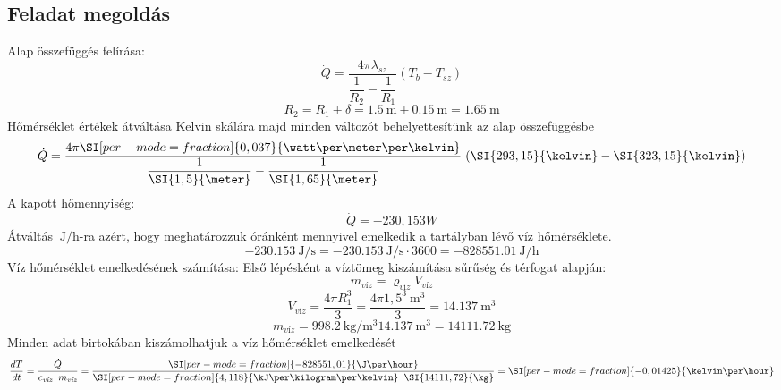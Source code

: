 \subsection*{Feladat megoldás}
Alap összefüggés felírása:
\begin{equation}
\dot{Q} =\dfrac{4 \pi  \lambda_{sz}}{\dfrac{1}{R_2} - \dfrac{1}{R_1}} (T_b-T_{sz}) 
\end{equation}
\begin{equation*}
R_2=R_1+\delta=\SI{1,5}{\meter}+\SI{0,15}{\meter}=\SI{1,65}{\meter}
\end{equation*}
Hőmérséklet értékek átváltása Kelvin skálára majd minden változót  behelyettesítünk az alap összefüggésbe 
\begin{equation}
\dot{Q}=\dfrac{4\pi\SI[per-mode=fraction]{0,037}{\watt\per\meter\per\kelvin}}
{\dfrac{1}{\SI{1,5}{\meter}}-\dfrac{1}{\SI{1,65}{\meter}}}
\hspace{1mm} (\SI{293,15}{\kelvin}-\SI{323,15}{\kelvin})
\end{equation}
A kapott hőmennyiség:
\begin{equation}
\dot{Q}=-230,153 W
\end{equation}
Átváltás $\SI[per-mode=fraction]{}{\J \per\hour}$-ra  azért, hogy meghatározzuk óránként mennyivel emelkedik a tartályban lévő víz hőmérséklete.
\begin{equation}
\SI[per-mode=fraction]{-230,153}{\J \per\second}=\SI[per-mode=fraction]{-230,153}{\J \per\second}\cdot 3600=\SI[per-mode=fraction]{-828551,01}{\J \per\hour}
\end{equation}
Víz hőmérséklet emelkedésének számítása:
Első lépésként a víztömeg kiszámítása sűrűség és térfogat alapján:
\begin{equation}
m_{\textit{víz}}=\varrho_{\textit{víz}} V_{\textit{víz}}
\end{equation}
\begin{equation}
V_{\textit{víz}}=\dfrac{4\pi R^3_1}{3}=\dfrac{4\pi 1,5^3\SI{}{\cubic \meter} }{3}=\SI{14,137}{\cubic \meter}
\end{equation}
\begin{equation}
m_{\textit{víz}}=\SI[per-mode=fraction]{998,2}{\kilogram\per\cubic\meter}\SI{14,137}{\cubic \meter} =\SI{14111,72}{\kg}
\end{equation}
Minden adat birtokában kiszámolhatjuk a víz hőmérséklet emelkedését
\begin{equation}
\dfrac{dT}{dt}=\dfrac{\dot{Q}}{c_{\textit{víz}} \hspace{2mm} m_{\textit{víz}}}=
\dfrac{\SI[per-mode=fraction]{-828551,01}{\J \per\hour}}{\SI[per-mode=fraction]{4,118}{\kJ \per \kilogram\per\kelvin} \hspace{2mm} \SI{14111,72}{\kg}}
=\SI[per-mode=fraction]{-0,01425}{\kelvin \per\hour}
\end{equation}
